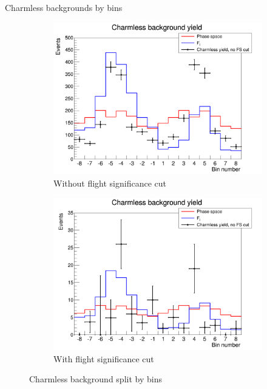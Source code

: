 \documentclass{beamer}
\begin{document}
\begin{frame}{Charmless backgrounds by bins}
  \begin{figure}
    \centering
    \vspace{-0.2cm}
    \begin{subfigure}{0.5\textwidth}
      \includegraphics[width = 1.0\textwidth]{CharmlessYieldsBin.png}
      \caption{Without flight significance cut}
    \end{subfigure}%
    \begin{subfigure}{0.5\textwidth}
      \includegraphics[width = 1.0\textwidth]{CharmlessYieldsFSCutBin.png}
      \caption{With flight significance cut}
    \end{subfigure}
    \caption{Charmless background split by bins}
  \end{figure}
\end{frame}
\end{document}
